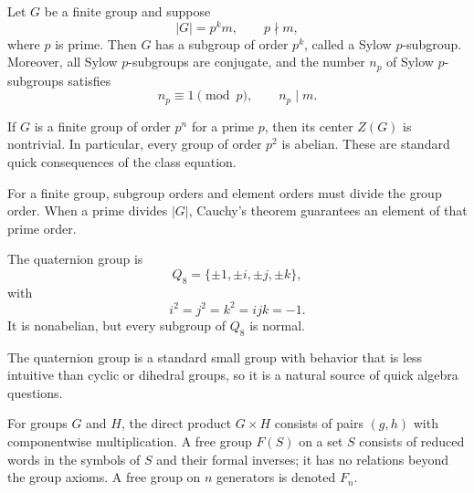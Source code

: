     \begin{theorem}
        Let $G$ be a finite group and suppose
        \[
            |G|=p^k m,
            \qquad
            p\nmid m,
        \]
        where $p$ is prime. Then $G$ has a subgroup of order $p^k$, called a
        Sylow $p$-subgroup. Moreover, all Sylow $p$-subgroups are conjugate, and
        the number $n_p$ of Sylow $p$-subgroups satisfies
        \[
            n_p\equiv 1\pmod p,
            \qquad
            n_p\mid m.
        \]
    \end{theorem}

    \begin{theorem}
        If $G$ is a finite group of order $p^n$ for a prime $p$, then its center
        $Z(G)$ is nontrivial. In particular, every group of order $p^2$ is
        abelian. These are standard quick consequences of the class equation.
    \end{theorem}

    \begin{strategy}
        For a finite group, subgroup orders and element orders must divide the group
        order. When a
        prime divides $|G|$, Cauchy's theorem guarantees an element of that prime
        order.
    \end{strategy}

    \begin{fact}
        The quaternion group is
        \[
            Q_8=\{\pm 1,\pm i,\pm j,\pm k\},
        \]
        with
        \[
            i^2=j^2=k^2=ijk=-1.
        \]
        It is nonabelian, but every subgroup of $Q_8$ is normal.
    \end{fact}

    \begin{remark}
        The quaternion group is a standard small group with behavior that is
        less intuitive than cyclic or dihedral groups, so it is a natural
        source of quick algebra questions.
    \end{remark}

    \begin{definition}
        For groups $G$ and $H$, the direct product $G\times H$ consists of
        pairs $(g,h)$ with componentwise multiplication. A free group
        $F(S)$ on a set $S$ consists of reduced words in the symbols of $S$ and
        their formal inverses; it has no relations beyond the group axioms. A
        free group on $n$ generators is denoted $F_n$.
    \end{definition}

